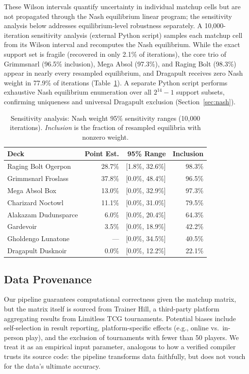 \documentclass[journal]{IEEEtran}
\let\origsubsection\subsection
\renewcommand{\subsection}{\needspace{3\baselineskip}\origsubsection}
\begin{document}
These Wilson intervals quantify uncertainty in individual matchup cells but are not propagated through the Nash equilibrium linear program; the sensitivity analysis below addresses equilibrium-level robustness separately.
A 10{,}000-iteration sensitivity analysis (external Python script) samples each matchup cell from its Wilson interval and recomputes the Nash equilibrium.
While the exact support set is fragile (recovered in only 2.1\% of iterations), the core trio of Grimmsnarl (96.5\% inclusion), Mega Absol (97.3\%), and Raging Bolt (98.3\%) appear in nearly every resampled equilibrium, and Dragapult receives zero Nash weight in 77.9\% of iterations (Table~\ref{tab:bootstrap}).
A separate Python script performs exhaustive Nash equilibrium enumeration over all $2^{14}-1$ support subsets, confirming uniqueness and universal Dragapult exclusion (Section~\ref{sec:nash}).

\begin{table}[!t]
\centering
\caption{Sensitivity analysis: Nash weight 95\% sensitivity ranges (10{,}000 iterations). \emph{Inclusion} is the fraction of resampled equilibria with nonzero weight.}
\label{tab:bootstrap}
\begin{tabular}{l r r r}
\toprule
Deck & Point Est. & 95\% Range & Inclusion \\
\midrule
Raging Bolt Ogerpon   & 28.7\% & [1.8\%, 32.6\%] & 98.3\% \\
Grimmsnarl Froslass   & 37.8\% & [0.0\%, 48.4\%] & 96.5\% \\
Mega Absol Box        & 13.0\% & [0.0\%, 32.9\%] & 97.3\% \\
Charizard Noctowl     & 11.1\% & [0.0\%, 31.0\%] & 79.5\% \\
Alakazam Dudunsparce  &  6.0\% & [0.0\%, 20.4\%] & 64.3\% \\
Gardevoir             &  3.5\% & [0.0\%, 18.9\%] & 42.2\% \\
Gholdengo Lunatone    &  ---   & [0.0\%, 34.5\%] & 40.5\% \\
Dragapult Dusknoir    &  0.0\% & [0.0\%, 12.2\%] & 22.1\% \\
\bottomrule
\end{tabular}
\end{table}

\subsection{Data Provenance}

Our pipeline guarantees computational correctness given the matchup matrix, but the matrix itself is sourced from Trainer Hill, a third-party platform aggregating results from Limitless TCG tournaments.
Potential biases include self-selection in result reporting, platform-specific effects (e.g., online vs.\ in-person play), and the exclusion of tournaments with fewer than 50 players.
We treat it as an empirical input parameter, analogous to how a verified compiler trusts its source code: the pipeline transforms data faithfully, but does not vouch for the data's ultimate accuracy.
\end{document}
